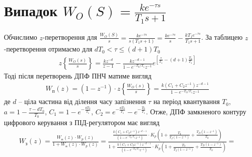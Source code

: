 \section{Випадок \texorpdfstring{$W_O(S) = \frac{k e^{-\tau s}}{T_1 s + 1}$}{3}}
Обчислимо $z$-перетворення для $\frac{W_O(S)}{s} = \frac{k e^{-\tau s}}{s(T_1 s + 1)} = 
\frac{k e^{-\tau s}}{s} - \frac{k T_1 e^{-\tau s}}{T_1 s + 1}$.
За таблицею $z$-перетворення отримаємо для $d T_0 < \tau \leq (d+1)T_0$
\begin{gather}
    z\left\{\frac{W_O(s)}{s} \right\} = \frac{k z^{-d}}{z - 1} - 
    \frac{k z^{-d-1}}{1 - e^{-T_0/ T_1} z^{-1}} 
    e^{\left[
        \frac{\tau}{T_1} - (d+1) \frac{T_0}{T_1}
     \right]}
\end{gather}
Тоді після перетворень ДПФ ПНЧ матиме вигляд
\begin{gather}\label{transfer_function_for_stability}
    W_{\text{п}}(z) = \left(1 - z^{-1}\right) \cdot z\left\{\frac{W_O(s)}{s} \right\} = 
    \frac{
        k \left(C_1 + C_2 z^{-1}\right) z^{-d-1}
    }{
        1 - e^{-T_0 / T_1} z^{-1}
    }
\end{gather}
де $d$ -- ціла частина від ділення часу запізнення $\tau$ на період квантування
$T_0$, $a = 1 - \frac{\tau - d T_0}{T_0}$, $C_1 = 1 - e^{-\frac{a T_0}{T_1}}$,
$C_2 = e^{-\frac{a T_0}{T_1}} - e^{-\frac{T_0}{T_1}}$.
Отже, ДПФ замкненого контуру цифрового керування з ПІД-регулятором має вигляд
\begin{gather*}
    W_{\text{з}}(z) = \frac{
        W_{\text{п}} (z) \cdot W_p(z)
    }{1 + W_{\text{п}} (z) \cdot W_p(z)} =
    \frac{
        \frac{
            k \left(C_1 + C_2 z^{-1}\right) z^{-d-1}
        }{
            \left(1 - e^{-T_0 / T_1} z^{-1}\right)
        } \cdot K_p \left(
            1 + \frac{T_0}{T_I \left(1 - z^{-1}\right)} + \frac{T_D\left(1 - z^{-1}\right)}{T_0}
        \right)
    }{
        1 + \frac{
            k \left(C_1 + C_2 z^{-1}\right) z^{-d-1}
        }{
            \left(1 - e^{-T_0 / T_1} z^{-1}\right)
        } \cdot K_p \left(
            1 + \frac{T_0}{T_I \left(1 - z^{-1}\right)} + \frac{T_D\left(1 - z^{-1}\right)}{T_0}
        \right)
    } =
\end{gather*}

